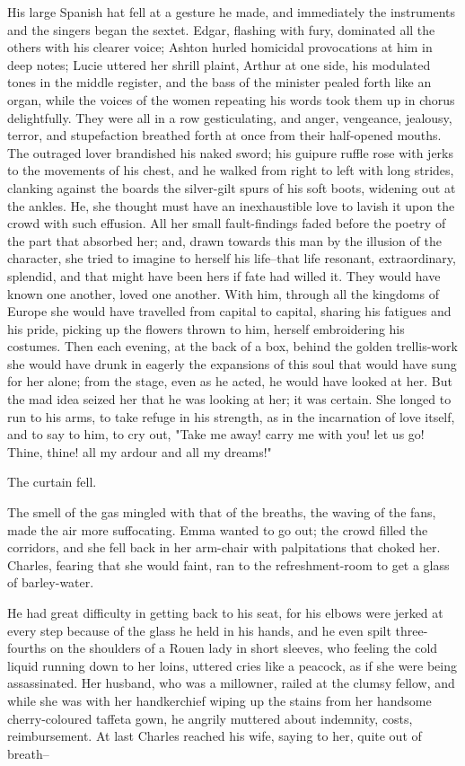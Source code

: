 \documentclass[11pt,twocolumn]{ltugboat}
\begin{document}
His large Spanish hat fell at a gesture he made, and immediately the
instruments and the singers began the sextet. Edgar, flashing with fury,
dominated all the others with his clearer voice; Ashton hurled homicidal
provocations at him in deep notes; Lucie uttered her shrill plaint,
Arthur at one side, his modulated tones in the middle register, and the
bass of the minister pealed forth like an organ, while the voices of the
women repeating his words took them up in chorus delightfully. They were
all in a row gesticulating, and anger, vengeance, jealousy, terror, and
stupefaction breathed forth at once from their half-opened mouths. The
outraged lover brandished his naked sword; his guipure ruffle rose with
jerks to the movements of his chest, and he walked from right to left
with long strides, clanking against the boards the silver-gilt spurs of
his soft boots, widening out at the ankles. He, she thought must have an
inexhaustible love to lavish it upon the crowd with such effusion.
All her small fault-findings faded before the poetry of the part
that absorbed her; and, drawn towards this man by the illusion of the
character, she tried to imagine to herself his life--that life resonant,
extraordinary, splendid, and that might have been hers if fate had
willed it. They would have known one another, loved one another. With
him, through all the kingdoms of Europe she would have travelled from
capital to capital, sharing his fatigues and his pride, picking up the
flowers thrown to him, herself embroidering his costumes. Then each
evening, at the back of a box, behind the golden trellis-work she would
have drunk in eagerly the expansions of this soul that would have sung
for her alone; from the stage, even as he acted, he would have looked
at her. But the mad idea seized her that he was looking at her; it was
certain. She longed to run to his arms, to take refuge in his strength,
as in the incarnation of love itself, and to say to him, to cry out,
"Take me away! carry me with you! let us go! Thine, thine! all my ardour
and all my dreams!"

The curtain fell.

The smell of the gas mingled with that of the breaths, the waving of the
fans, made the air more suffocating. Emma wanted to go out; the
crowd filled the corridors, and she fell back in her arm-chair with
palpitations that choked her. Charles, fearing that she would faint, ran
to the refreshment-room to get a glass of barley-water.

He had great difficulty in getting back to his seat, for his elbows were
jerked at every step because of the glass he held in his hands, and
he even spilt three-fourths on the shoulders of a Rouen lady in short
sleeves, who feeling the cold liquid running down to her loins, uttered
cries like a peacock, as if she were being assassinated. Her husband,
who was a millowner, railed at the clumsy fellow, and while she was with
her handkerchief wiping up the stains from her handsome cherry-coloured
taffeta gown, he angrily muttered about indemnity, costs, reimbursement.
At last Charles reached his wife, saying to her, quite out of breath--
\end{document}
